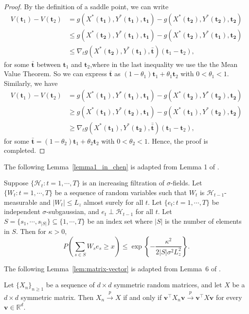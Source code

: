 \documentclass[12pt]{article}
\begin{document}
\begin{lemma}
\begin{proof}
By the definition of a saddle point, we can write
\begin{align*}
    V(\bm{t}_1) - V(\bm{t}_2) &= g(X^\ast(\bm{t_1}),Y^\ast(\bm{t_1}),\bm{t_1}) - g(X^\ast(\bm{t_2}),Y^\ast(\bm{t_2}),\bm{t_2}) \\
    & \le g(X^\ast(\bm{t_2}),Y^\ast(\bm{t_1}),\bm{t_1}) - g(X^\ast(\bm{t_2}),Y^\ast(\bm{t_1}),\bm{t_2}) \\
    & \le \nabla_t g(X^\ast(\bm{t_2}),Y^\ast(\bm{t_1}),\bar{\bm{t}})(\bm{t}_1-\bm{t}_2),
\end{align*}
for some $\bar{\bm{t}}$ between $\bm{t}_1$ and $\bm{t}_2$,where in the last inequality we use the the Mean Value Theorem. So we can express $\bar{\bm{t}}$ as $(1-\theta_1)\bm{t}_1+\theta_1\bm{t}_2$ with $0<\theta_1<1$. Similarly, we have
\begin{align*}
    V(\bm{t}_1) - V(\bm{t}_2) &= g(X^\ast(\bm{t_1}),Y^\ast(\bm{t_1}),\bm{t_1}) - g(X^\ast(\bm{t_2}),Y^\ast(\bm{t_2}),\bm{t_2}) \\
    & \ge g(X^\ast(\bm{t_1}),Y^\ast(\bm{t_2}),\bm{t_1}) - g(X^\ast(\bm{t_1}),Y^\ast(\bm{t_2}),\bm{t_2}) \\
    & \ge \nabla_t g(X^\ast(\bm{t_1}),Y^\ast(\bm{t_2}),\bar{\bar{\bm{t}}})(\bm{t}_1-\bm{t}_2),
\end{align*}
for some $\bar{\bm{t}} = (1-\theta_2)\bm{t}_1+\theta_2\bm{t}_2$  with $0<\theta_2<1$. Hence, the proof is completed.
\end{proof}
\end{lemma}

The following Lemma~\ref{lemma1_in_chen} is adapted from Lemma 1 of \cite{chen2021statistical}.
\begin{lemma}
\label{lemma1_in_chen}
Suppose $\{\mathcal{H}_t : t = 1,\cdots,T\}$ is an increasing filtration of $\sigma$-fields. Let $\{W_t : t = 1,\cdots,T\}$ be a sequence of random variables such that $W_t$ is $\mathcal{H}_{t-1}$-measurable and $|W_t| \leq L_z$ almost surely for all $t$. Let $\{e_t : t = 1,\cdots,T\}$ be independent $\sigma$-subgaussian, and $e_t \perp \mathcal{H}_{t-1}$ for all $t$. Let $S=\{s_1,\cdots,s_{|S|}\}\subseteq \{1,\cdots,T\}$ be an index set where $|S|$ is the number of elements in $S$. Then for $\kappa>0$,
\[
P\left(\sum_{s\in S} W_s e_s \geq x\right)
\leq
\exp\left\{
-\frac{\kappa^2}{2|S|\sigma^2 L_z^2}
\right\}.
\]
\end{lemma}


The following Lemma~\ref{lem:matrix-vector} is adapted from Lemma~6 of
\citet{chen2021statistical}.
\begin{lemma}
\label{lem:matrix-vector}
Let $\{X_n\}_{n\ge1}$ be a sequence of $d\times d$ symmetric random matrices, and let $X$ be a $d\times d$ symmetric matrix. Then $X_n \stackrel{p}{\to} X$ if and only if $\bm v^\top X_n \bm v \stackrel{p}{\to} \bm v^\top X \bm v$ for every $\bm v\in\mathbb R^d$.
\end{lemma}
\end{document}
